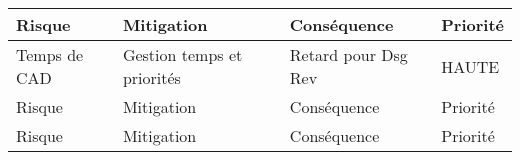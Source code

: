 \begin{tabularx}{\linewidth}{
    |>{\hsize=0.40\hsize}X|%
    >{\hsize=0.25\hsize}X|%
    >{\hsize=0.25\hsize}X|%
    >{\hsize=0.1\hsize}X|%
  }
    \hline
    \textbf{Risque} & \textbf{Mitigation} & \textbf{Conséquence} & \textbf{Priorité}\\\hline
    Temps de CAD & Gestion temps et priorités & Retard pour Dsg Rev & HAUTE\\\hline
    Risque & Mitigation & Conséquence & Priorité\\\hline
    Risque & Mitigation & Conséquence & Priorité\\\hline
  \end{tabularx}
  
  

  
